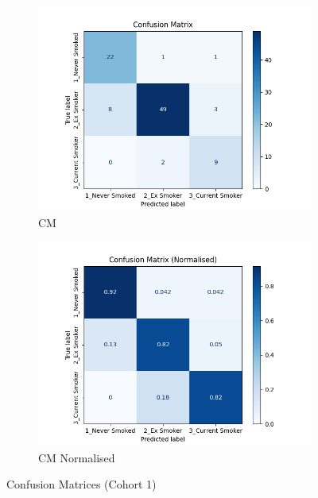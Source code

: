 \documentclass{article}
\begin{document}
\begin{figure}
    \begin{subfigure}{0.49\textwidth}
        \centering
        \includegraphics[width=\linewidth]{cohort1_cm.png}
        \caption{CM}
    \end{subfigure}
    \hfill
    \begin{subfigure}{0.49\textwidth}
        \centering
        \includegraphics[width=\linewidth]{cohort1_cm_n.png}
        \caption{CM Normalised}
    \end{subfigure}
    \caption{Confusion Matrices (Cohort 1)}
\end{figure}
\end{document}

